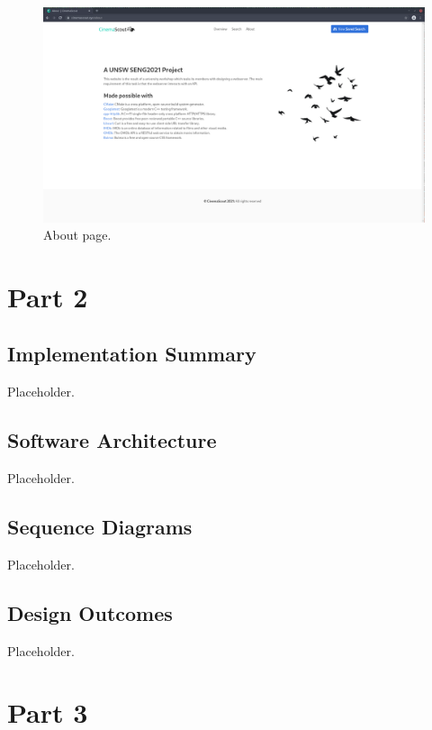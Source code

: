 \documentclass{article}
\begin{document}
\begin{figure}[H]
\includegraphics[width=\columnwidth]{res/about.png}
\caption{About page.}
\end{figure}
\newpage
\section{Part 2}
\subsection{Implementation Summary}
Placeholder.
\subsection{Software Architecture}
Placeholder.
\subsection{Sequence Diagrams}
Placeholder.
\subsection{Design Outcomes}
Placeholder.

\section{Part 3}
\end{document}
